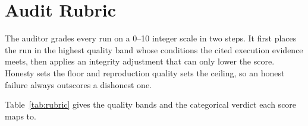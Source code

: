 \documentclass{article} %
\begin{document}

\section{Audit Rubric}
\label{app:rubric}

The auditor grades every run on a 0--10 integer scale in two
steps. It first places the run in the highest quality band whose conditions
the cited execution evidence meets, then applies an integrity adjustment
that can only lower the score. Honesty sets the floor and reproduction
quality sets the ceiling, so an honest failure always outscores a dishonest
one.

Table~\ref{tab:rubric} gives the quality bands and the categorical verdict
each score maps to.
\end{document}
